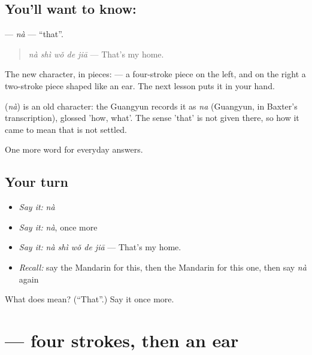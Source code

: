 \subsection*{You'll want to know: }
\textbf{} — \emph{nà} — \textquotedblleft{}that\textquotedblright{}.

\begin{quote}
\textbf{} \emph{nà shì wǒ de jiā} — That's my home.
\end{quote}

The new character, in pieces:  — a four-stroke piece on the left, and on the right a two-stroke piece shaped like an ear. The next lesson puts it in your hand.

\begin{cousinweb}
\textbf{} (\emph{nà}) is an old character: the Guangyun records it as \emph{na} (Guangyun, in Baxter's transcription), glossed 'how, what'. The sense 'that' is not given there, so how it came to mean that is not settled.
\end{cousinweb}

\begin{grammarlens}[title={What you've built}]
One more word for everyday answers.
\end{grammarlens}

\subsection*{Your turn}
\begin{itemize}
\raggedright
  \item \emph{Say it:} \emph{nà}
  \item \emph{Say it:} \emph{nà}, once more
  \item \emph{Say it:} \emph{nà shì wǒ de jiā} — That's my home.
  \item \emph{Recall:} say the Mandarin for this, then the Mandarin for this one, then say \emph{nà} again
\end{itemize}

\begin{tcolorbox}[breakable,colback=teal!4,colframe=teal!35!black,title={Before you move on}]
What does  mean? (\textquotedblleft{}That\textquotedblright{}.) Say it once more.
\end{tcolorbox}
\section[\texorpdfstring{\zh{那} (nà)}{那 (nà)}]{ — four strokes, then an ear}


